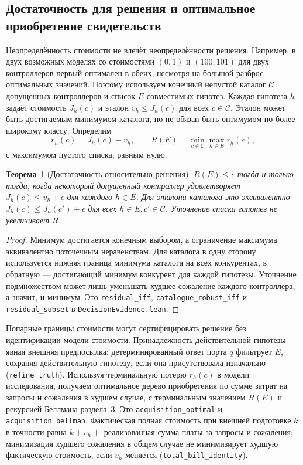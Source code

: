 \documentclass[10pt,a4paper]{article}
\newtheorem{theorem}{Теорема}[section]
\newcommand{\rc}[1]{\allowbreak\texttt{#1}\allowbreak}
\begin{document}
\subsection{Достаточность для решения и оптимальное приобретение свидетельств}
Неопределённость стоимости не влечёт неопределённости решения. Например, в двух возможных моделях со стоимостями $(0,1)$ и $(100,101)$ для двух контроллеров первый оптимален в обеих, несмотря на большой разброс оптимальных значений. Поэтому используем конечный непустой каталог $\mathcal C$ допущенных контроллеров и список $E$ совместимых гипотез. Каждая гипотеза $h$ задаёт стоимость $J_h(c)$ и эталон $v_h\le J_h(c)$ для всех $c\in\mathcal C$. Эталон может быть достигаемым минимумом каталога, но не обязан быть оптимумом по более широкому классу. Определим
\[
 r_h(c)=J_h(c)-v_h,\qquad R(E)=\min_{c\in\mathcal C}\max_{h\in E}r_h(c),
\]
с максимумом пустого списка, равным нулю.
\begin{theorem}[Достаточность относительно решения]\label{thm:decision}
$R(E)\le\epsilon$ тогда и только тогда, когда некоторый допущенный контроллер удовлетворяет $J_h(c)\le v_h+\epsilon$ для каждого $h\in E$. Для эталона каталога это эквивалентно $J_h(c)\le J_h(c')+\epsilon$ для всех $h\in E,c'\in\mathcal C$. Уточнение списка гипотез не увеличивает $R$.
\end{theorem}
\begin{proof}
Минимум достигается конечным выбором, а ограничение максимума эквивалентно поточечным неравенствам. Для каталога в одну сторону используется нижняя граница минимума каталога на всех конкурентах, в обратную --- достигающий минимум конкурент для каждой гипотезы. Уточнение подмножеством может лишь уменьшать худшее сожаление каждого контроллера, а значит, и минимум. Это \rc{residual\_iff}, \rc{catalogue\_robust\_iff} и \rc{residual\_subset} в \rc{DecisionEvidence.lean}.
\end{proof}
Попарные границы стоимости могут сертифицировать решение без идентификации модели стоимости. Принадлежность действительной гипотезы --- явная внешняя предпосылка: детерминированный ответ порта $q$ фильтрует $E$, сохраняя действительную гипотезу, если она присутствовала изначально (\rc{refine\_truth}). Используя терминальную потерю $r_h(c)$ в модели исследования, получаем оптимальное дерево приобретения по сумме затрат на запросы и сожаления в худшем случае, с терминальным значением $R(E)$ и рекурсией Беллмана раздела~3. Это \rc{acquisition\_optimal} и \rc{acquisition\_bellman}. Фактическая полная стоимость при внешней подготовке $k$ в точности равна $k+v_h+$ реализованная сумма платы за запросы и сожаления; минимизация худшего сожаления в общем случае не минимизирует худшую фактическую стоимость, если $v_h$ меняется (\rc{total\_bill\_identity}).
\end{document}
